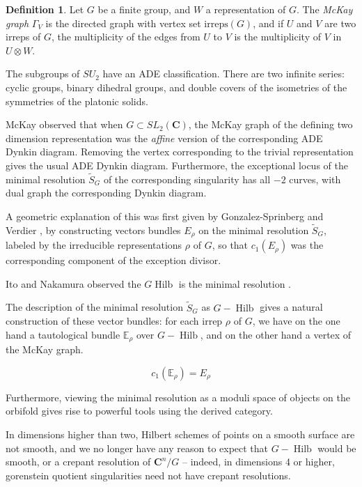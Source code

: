 \documentclass{amsart}[12pt]
\theoremstyle{definition}
\newtheorem{definition}[dummy]{Definition}
\newcommand{\C}{\mathbf{C}}
\newcommand{\irreps}{\text{irreps}}
\DeclareMathOperator{\Hilb}{Hilb}
\begin{document}
\begin{definition}
Let $G$ be a finite group, and $W$ a representation of $G$.  The \emph{McKay graph} $\Gamma_V$ is the directed graph with vertex set $\irreps(G)$, and if $U$ and $V$ are two irreps of $G$, the multiplicity of the edges from $U$ to $V$ is the multiplicity of $V$ in $U\otimes W$.
\end{definition}

The subgroups of $SU_2$ have an ADE classification.  There are two infinite series: cyclic groups, binary dihedral groups, and double covers of the isometries of the symmetries of the platonic solids.

McKay observed \cite{McKay} that when $G\subset SL_2(\C)$, the McKay graph of the defining two dimension representation was the \emph{affine} version of the corresponding ADE Dynkin diagram.  Removing the vertex corresponding to the trivial representation gives the usual ADE Dynkin diagram.  Furthermore, the exceptional locus of the minimal resolution $\widetilde{S}_G$ of the corresponding singularity has all $-2$ curves, with dual graph the corresponding Dynkin diagram. 






A geometric explanation of this was first given by Gonzalez-Sprinberg and Verdier \cite{GSV}, by constructing vectors bundles $E_\rho$ on the minimal resolution $\widetilde{S}_G$, labeled by the irreducible representations $\rho$ of $G$, so that $c_1(E_\rho)$ was the corresponding component of the exception divisor.

Ito and Nakamura observed the $G\Hilb$ is the minimal resolution \cite{IN}.

The description of the minimal resolution $\widetilde{S}_G$ as $G-\Hilb$ gives a natural construction of these vector bundles: for each irrep $\rho$ of $G$, we have on the one hand a tautological bundle $\mathbb{E}_\rho$ over $G-\Hilb$, and on the other hand a vertex of the McKay graph.  

$$c_1(\mathbb{E}_\rho)=E_\rho$$

Furthermore, viewing the minimal resolution as a moduli space of objects on the orbifold gives rise to powerful tools using the derived category.  

In dimensions higher than two, Hilbert schemes of points on a smooth surface are not smooth, and we no longer have any reason to expect that $G-\Hilb$ would be smooth, or a crepant resolution of $\C^n/G$ -- indeed, in dimensions 4 or higher, gorenstein quotient singularities need not have crepant resolutions.
\end{document}
